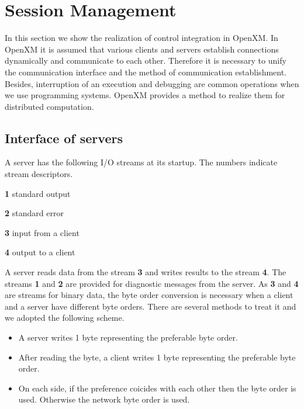 
\section{Session Management}

 
In this section we show the realization of control integration in
OpenXM.  In OpenXM it is assumed that various clients and servers
establish connections dynamically and communicate to each
other. Therefore it is necessary to unify the communication interface
and the method of communication establishment.  Besides, interruption
of an execution and debugging are common operations when we use
programming systems. OpenXM provides a method to realize them for
distributed computation.

\subsection{Interface of servers}

A server has the following I/O streams at its startup. The numbers
indicate stream descriptors.

\begin{description}
\item{\bf 1} standard output
\item{\bf 2} standard error
\item{\bf 3} input from a client
\item{\bf 4} output to a client
\end{description}

A server reads data from the stream {\bf 3} and writes results to the
stream {\bf 4}. The streams {\bf 1} and {\bf 2} are provided for
diagnostic messages from the server.  As {\bf 3} and {\bf 4} are
streams for binary data, the byte order conversion is necessary when a
client and a server have different byte orders. There are several
methods to treat it and we adopted the following scheme.

\begin{itemize}
\item A server writes 1 byte representing the preferable byte order.
\item After reading the byte, a client writes 1 byte representing the
preferable byte order.
\item On each side, if the preference coicides with each other then
the byte order is used. Otherwise the network byte order is used.
\end{itemize}

